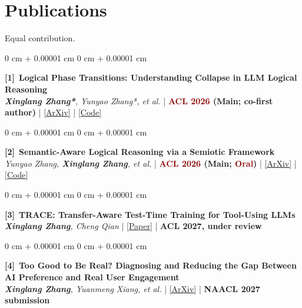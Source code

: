 \documentclass[10pt, letterpaper]{article}
\newcommand{\distinction}[1]{\textcolor{darkRed}{#1}}
\newcommand{\pubnum}[1]{{\footnotesize\textbf{[#1]}}}
\newenvironment{onecolentry}{
    \begin{adjustwidth}{
        0 cm + 0.00001 cm
    }{
        0 cm + 0.00001 cm
    }
}{
\end{adjustwidth}
} %
\begin{document}
\newpage
\begingroup
\fontsize{10}{11}\selectfont
\section{Publications}
{\small * Equal contribution.}\par\smallskip

\begin{onecolentry}
\pubnum{1}~\textbf{Logical Phase Transitions: Understanding Collapse in LLM Logical Reasoning} \\
\textit{\textbf{Xinglang Zhang*}, Yunyao Zhang*, et al.} | \textbf{\distinction{ACL 2026} (Main; co-first author)} |
\href{https://arxiv.org/abs/2601.02902}{\color{blue}[ArXiv]} |
\href{https://github.com/AI4SS/Logical-Phase-Transitions}{\color{blue}[Code]}
\end{onecolentry}
\vspace{0.08 cm}

\begin{onecolentry}
\pubnum{2}~\textbf{Semantic-Aware Logical Reasoning via a Semiotic Framework} \\
\textit{Yunyao Zhang, \textbf{Xinglang Zhang}, et al.} | \textbf{\distinction{ACL 2026} (Main; \distinction{Oral})} |
\href{https://arxiv.org/abs/2509.24765}{\color{blue}[ArXiv]} |
\href{https://github.com/AI4SS/Logic-Agent}{\color{blue}[Code]}
\end{onecolentry}
\vspace{0.08 cm}

\begin{onecolentry}
\pubnum{3}~\textbf{TRACE: Transfer-Aware Test-Time Training for Tool-Using LLMs} \\
\textit{\textbf{Xinglang Zhang}, Cheng Qian} |
\href{https://drive.google.com/file/d/1_pGifgLGeNbYhm97wl-YnW84gn0-pHmm/view?usp=sharing}{\color{blue}[Paper]} |
\textbf{ACL 2027, under review}
\end{onecolentry}
\vspace{0.08 cm}

\begin{onecolentry}
\pubnum{4}~{\small\textbf{Too Good to Be Real? Diagnosing and Reducing the Gap Between AI Preference and Real User Engagement}} \\
\textit{\textbf{Xinglang Zhang}, Yuanmeng Xiang, et al.} |
\href{https://arxiv.org/abs/2609.18282}{\color{blue}[ArXiv]} |
\textbf{NAACL 2027 submission}
\end{onecolentry}
\vspace{0.08 cm}
\end{document}
